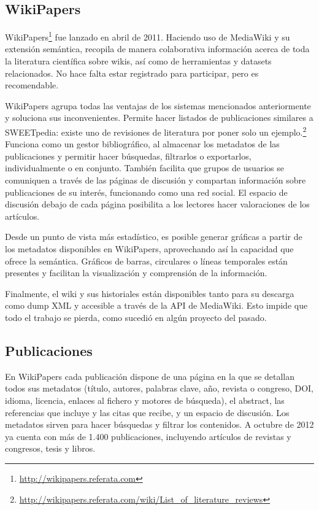 \documentclass[twoside]{article}
\begin{document}
\begin{multicols}{2}
\section{WikiPapers}
WikiPapers\footnote{\href{http://wikipapers.referata.com}{http://wikipapers.referata.com}} fue lanzado en abril de 2011. Haciendo uso de MediaWiki y su extensi\'{o}n sem\'{a}ntica, recopila de manera colaborativa informaci\'{o}n acerca de toda la literatura cient\'{i}fica sobre wikis, as\'{i} como de herramientas y datasets relacionados. No hace falta estar registrado para participar, pero es recomendable.

WikiPapers agrupa todas las ventajas de los sistemas mencionados anteriormente y soluciona sus inconvenientes. Permite hacer listados de publicaciones similares a SWEETpedia: existe uno de revisiones de literatura por poner solo un ejemplo.\footnote{\href{http://wikipapers.referata.com/wiki/List_of_literature_reviews}{http://wikipapers.referata.com/wiki/List\_of\_literature\_reviews}} Funciona como un gestor bibliogr\'{a}fico, al almacenar los metadatos de las publicaciones y permitir hacer b\'{u}squedas, filtrarlos o exportarlos, individualmente o en conjunto. Tambi\'{e}n facilita que grupos de usuarios se comuniquen a trav\'{e}s de las p\'{a}ginas de discusi\'{o}n y compartan informaci\'{o}n sobre publicaciones de su inter\'{e}s, funcionando como una red social. El espacio de discusi\'{o}n debajo de cada p\'{a}gina posibilita a los lectores hacer valoraciones de los art\'{i}culos.

Desde un punto de vista m\'{a}s estad\'{i}stico, es posible generar gr\'{a}ficas a partir de los metadatos disponibles en WikiPapers, aprovechando as\'{i} la capacidad que ofrece la sem\'{a}ntica. Gr\'{a}ficos de barras, circulares o l\'{i}neas temporales est\'{a}n presentes y facilitan la visualizaci\'{o}n y comprensi\'{o}n de la informaci\'{o}n.

Finalmente, el wiki y sus historiales est\'{a}n disponibles tanto para su descarga como dump XML y accesible a trav\'{e}s de la API de MediaWiki. Esto impide que todo el trabajo se pierda, como sucedi\'{o} en alg\'{u}n proyecto del pasado.

\subsection{Publicaciones}
En WikiPapers cada publicaci\'{o}n dispone de una p\'{a}gina en la que se detallan todos sus metadatos (t\'{i}tulo, autores, palabras clave, a\~{n}o, revista o congreso, DOI, idioma, licencia, enlaces al fichero y motores de b\'{u}squeda), el abstract, las referencias que incluye y las citas que recibe, y un espacio de discusi\'{o}n. Los metadatos sirven para hacer b\'{u}squedas y filtrar los contenidos. A octubre de 2012 ya cuenta con m\'{a}s de 1.400 publicaciones, incluyendo art\'{i}culos de revistas y congresos, tesis y libros.


\end{multicols}
\end{document}
